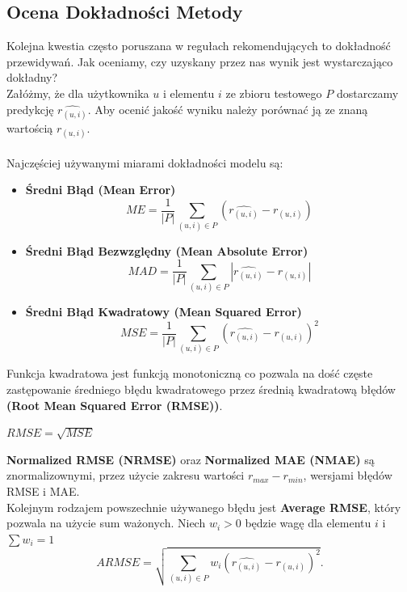 \documentclass[12pt,a4paper]{report}
\begin{document}
\subsection{Ocena Dokładności Metody}%
Kolejna kwestia często poruszana w regułach rekomendujących to dokładność przewidywań. Jak oceniamy, czy uzyskany przez nas wynik jest wystarczająco dokładny? 
\\Załóżmy, że dla użytkownika $u$ i elementu $i$ ze zbioru testowego $P$ dostarczamy predykcję $\widehat{r_{(u,i)}}$. Aby ocenić jakość wyniku należy porównać ją ze znaną wartością $r_{(u,i)}$.
\\
\\Najczęściej używanymi miarami dokładności modelu są:
\begin{itemize}
\item \textbf{Średni Błąd (Mean Error)}
$$ME = \frac{1}{|P|}\sum_{(u,i)\in P}(\widehat{r_{(u,i)}}-r_{(u,i)})$$

\item \textbf{Średni Błąd Bezwzględny (Mean Absolute Error)}
$$MAD = \frac{1}{|P|}\sum_{(u,i)\in P}|\widehat{r_{(u,i)}}-r_{(u,i)}|$$

\item \textbf{Średni Błąd Kwadratowy (Mean Squared Error)}
$$MSE = \frac{1}{|P|}\sum_{(u,i)\in P}(\widehat{r_{(u,i)}}-r_{(u,i)})^2$$
\end{itemize}
Funkcja kwadratowa jest funkcją monotoniczną co pozwala na dość częste zastępowanie średniego błędu kwadratowego przez średnią kwadratową błędów \textbf{(Root Mean Squared Error (RMSE))}.
\begin{center}
$RMSE = \sqrt{MSE}$
\end{center} 
\textbf{Normalized RMSE (NRMSE)} oraz \textbf{Normalized MAE (NMAE)} są znormalizownymi, przez użycie zakresu wartości $r_{max} - r_{min}$, wersjami błędów RMSE i MAE.
\\Kolejnym rodzajem powszechnie używanego błędu jest \textbf{Average RMSE}, który pozwala na użycie sum ważonych. Niech $w_i>0$ będzie wagę dla elementu $i$ i $\sum w_i = 1$
$$ARMSE = \sqrt{\sum_{(u,i)\in P}w_{i}(\widehat{r_{(u,i)}}-r_{(u,i)})^2}.$$
\end{document}
